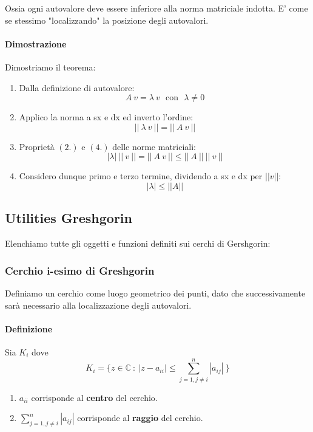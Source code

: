 \documentclass{article}
\begin{document}
Ossia ogni autovalore deve essere inferiore alla norma matriciale indotta.
E' come se stessimo "localizzando" la posizione degli autovalori.

\paragraph{Dimostrazione} Dimostriamo il teorema:

\begin{enumerate}
    \item Dalla definizione di autovalore:
    \[ A\:v = \lambda\:v \:\:\: \text{con} \:\:\: \lambda \neq0\]
    \item Applico la norma a sx e dx ed inverto l'ordine:
    \[ ||\:\lambda\:v\:|| = ||\:A\:v\:||\]
    \item Proprietà $(2.)$ e $(4.)$ delle norme matriciali:
    \[ |\lambda|\:||\:v\:|| = ||\:A\:v \:|| \leq ||\:A\:|| \:||\:v\:|| \]
    \item Considero dunque primo e terzo termine, dividendo a sx e dx per $||v||$:
    \[ \boxed{|\lambda| \leq ||A||} \]
\end{enumerate}

\newpage

\subsection{Utilities Greshgorin}

Elenchiamo tutte gli oggetti e funzioni definiti sui cerchi di Gershgorin:

\subsubsection{Cerchio i-esimo di Greshgorin}

Definiamo un cerchio come luogo geometrico dei punti, dato che successivamente sarà necessario alla localizzazione degli autovalori.

\paragraph{Definizione} Sia $K_{i}$ dove
\[ \boxed{K_{i} = \{ z \in \mathbb{C} \: : \: |z-a_{ii}| \leq \sum_{j=1, j\neq i}^{n}|a_{ij}|  \: \} }\]

\begin{enumerate}
    \item $a_{ii}$ corrisponde al \textbf{centro} del cerchio.
    \item $\sum_{j=1, j\neq i}^{n}|a_{ij}|$ corrisponde al \textbf{raggio} del cerchio.
\end{enumerate}
\end{document}
